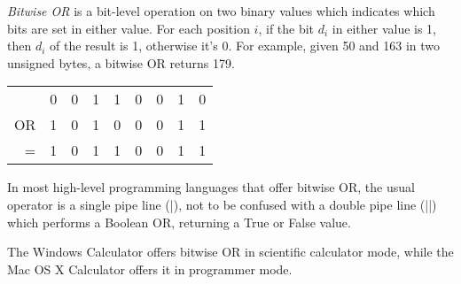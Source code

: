 \documentclass[12pt]{article}
\begin{document}
{\em Bitwise OR} is a bit-level operation on two binary values which indicates which bits are set in either value. For each position $i$, if the bit $d_i$ in either value is 1, then $d_i$ of the result is 1, otherwise it's 0. For example, given 50 and 163 in two unsigned bytes, a bitwise OR returns 179.

\begin{tabular}{|r|c|c|c|c|c|c|c|c|}
   & 0 & 0 & 1 & 1 & 0 & 0 & 1 & 0 \\
OR & 1 & 0 & 1 & 0 & 0 & 0 & 1 & 1 \\
 = & 1 & 0 & 1 & 1 & 0 & 0 & 1 & 1 \\
\end{tabular}

In most high-level programming languages that offer bitwise OR, the usual operator is a single pipe line (|), not to be confused with a double pipe line (||) which performs a Boolean OR, returning a True or False value.

The Windows Calculator offers bitwise OR in scientific calculator mode, while the Mac OS X Calculator offers it in programmer mode.
\end{document}
